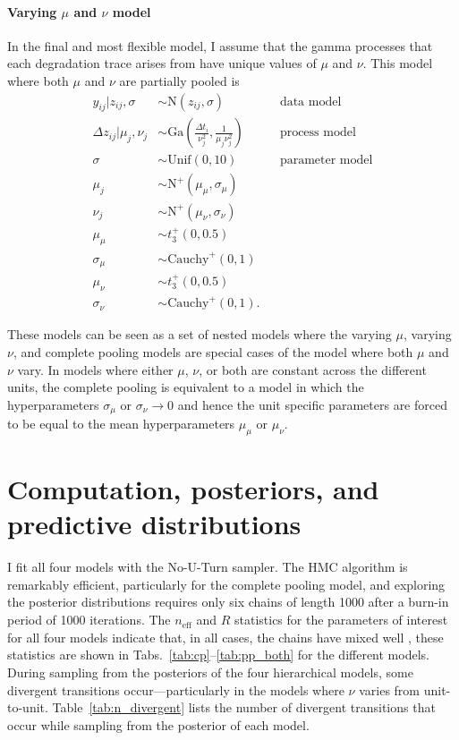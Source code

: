 \paragraph{Varying $\mu$ and $\nu$ model} In the final and most flexible model, I assume that the gamma processes that each degradation trace arises from have unique values of $\mu$ and $\nu$. This model where both $\mu$ and $\nu$ are partially pooled is
\begin{align*} 
   y_{ij}|z_{ij}, \sigma & \sim \mbox{N}(z_{ij}, \sigma)  && \mbox{data model} \\
   \Delta z_{ij}|\mu_j, \nu_j & \sim \mbox{Ga} \left( \frac{\Delta t_{i}}{\nu_j^2}, \frac{1}{\mu_j \nu_j^2} \right) && \mbox{process model} \\
   \sigma & \sim \mbox{Unif}(0, 10) && \mbox{parameter model} \\
   \mu_j & \sim \mbox{N}^{+}(\mu_{\mu}, \sigma_{\mu}) \\
   \nu_j & \sim \mbox{N}^{+}(\mu_{\nu}, \sigma_{\nu}) \\
   \mu_{\mu} & \sim t^{+}_3(0, 0.5) \\
   \sigma_{\mu} & \sim \mbox{Cauchy}^{+}(0, 1) \\
   \mu_{\nu} & \sim t^{+}_3(0, 0.5) \\
   \sigma_{\nu} & \sim \mbox{Cauchy}^{+}(0, 1).
\end{align*}

These models can be seen as a set of nested models where the varying $\mu$, varying $\nu$, and complete pooling models are special cases of the model where both $\mu$ and $\nu$ vary. In models where either $\mu$, $\nu$, or both are constant across the different units, the complete pooling is equivalent to a model in which the hyperparameters $\sigma_\mu$ or $\sigma_\nu \longrightarrow 0$ and hence the unit specific parameters are forced to be equal to the mean hyperparameters $\mu_\mu$ or $\mu_\nu$.

\section{Computation, posteriors, and predictive distributions} \label{sec:unit-to-unit-sampling}

I fit all four models with the No-U-Turn sampler. The HMC algorithm is remarkably efficient, particularly for the complete pooling model, and exploring the posterior distributions requires only six chains of length 1000 after a burn-in period of 1000 iterations. The $n_{\mbox{eff}}$ and $\hat{R}$ statistics for the parameters of interest for all four models indicate that, in all cases, the chains have mixed well \citep{Vehtari_2021}, these statistics are shown in Tabs.~\ref{tab:cp}--\ref{tab:pp_both} for the different models. During sampling from the posteriors of the four hierarchical models, some divergent transitions occur---particularly in the models where $\nu$ varies from unit-to-unit. Table~\ref{tab:n_divergent} lists the number of divergent transitions that occur while sampling from the posterior of each model.

